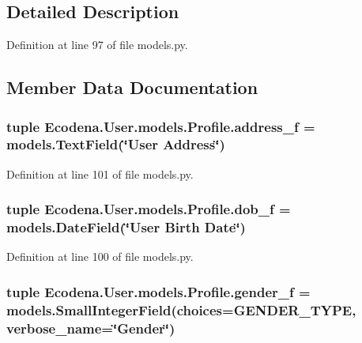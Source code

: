 \subsection{Detailed Description}


Definition at line 97 of file models.py.



\subsection{Member Data Documentation}
\hypertarget{class_ecodena_1_1_user_1_1models_1_1_profile_ad435c6b65d26e301bf02a029a83b6a5a}{
\subsubsection[{address\_\-f}]{\setlength{\rightskip}{0pt plus 5cm}tuple {\bf Ecodena.User.models.Profile.address\_\-f} = models.TextField(\char`\"{}User Address\char`\"{})}}
\label{d2/de8/class_ecodena_1_1_user_1_1models_1_1_profile_ad435c6b65d26e301bf02a029a83b6a5a}


Definition at line 101 of file models.py.

\hypertarget{class_ecodena_1_1_user_1_1models_1_1_profile_aa21eaecc5ddfe2d63af834e8872bbae5}{
\subsubsection[{dob\_\-f}]{\setlength{\rightskip}{0pt plus 5cm}tuple {\bf Ecodena.User.models.Profile.dob\_\-f} = models.DateField(\char`\"{}User Birth Date\char`\"{})}}
\label{d2/de8/class_ecodena_1_1_user_1_1models_1_1_profile_aa21eaecc5ddfe2d63af834e8872bbae5}


Definition at line 100 of file models.py.

\hypertarget{class_ecodena_1_1_user_1_1models_1_1_profile_ab5e59193a1b014e2f6ce017850bbc429}{
\subsubsection[{gender\_\-f}]{\setlength{\rightskip}{0pt plus 5cm}tuple {\bf Ecodena.User.models.Profile.gender\_\-f} = models.SmallIntegerField(choices={\bf GENDER\_\-TYPE}, verbose\_\-name=\char`\"{}Gender\char`\"{})}}
\label{d2/de8/class_ecodena_1_1_user_1_1models_1_1_profile_ab5e59193a1b014e2f6ce017850bbc429}


